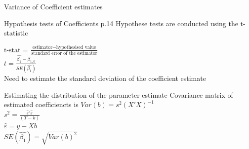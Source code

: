 \documentclass[14pt,xcolor=pdftex,dvipsnames,table]{beamer}\usepackage[]{graphicx}\usepackage[]{color}
\begin{document}
\begin{frame}{Variance of Coefficient estimates}
\graphicspath{{./Figures/}}
\begin{center}
\end{center}
\end{frame}

\begin{frame}{Hypothesis tests of Coefficients p.14}
Hypothese tests are conducted using the t-statistic
\begin{block}{}
$\text{t-stat} = \frac{\text{estimator} - \text{hypothesised value}}{\text{standard error of the estimator}}$\\ 
\vskip 0.5cm
$t = \frac{\hat{\beta_1}-\beta_{1,0}}{SE(\hat{\beta_1})}$\\
\vskip 0.5cm 
Need to estimate the standard deviation of the coefficient estimate
\end{block}
\end{frame}

\begin{frame}{Estimating the distribution of the parameter estimate}
Covariance matrix of estimated coefficiencts is
$Var(b) = s^2(X'X)^{-1}$\\
$s^2 = \frac{\hat{\varepsilon}'\hat{\varepsilon}}{(T - k)}$\\
$\hat{\varepsilon} = y - Xb$\\
$SE(\hat{\beta_1}) = \sqrt{Var(b)^2}$
\end{frame}
\end{document}
